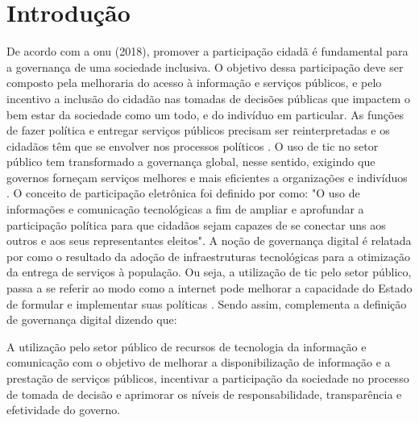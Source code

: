 \chapter[Introdução]{Introdução}
\label{cap:cap1}
\par
De acordo com a \acrfull{onu} (2018), promover a participação cidadã é fundamental para a governança de uma sociedade inclusiva.
O objetivo dessa participação deve ser composto pela melhoraria do acesso à informação e serviços públicos,
e pelo incentivo a inclusão do cidadão nas tomadas de decisões públicas que impactem o bem estar da sociedade como um todo, e do indivíduo em particular. 
As funções de fazer política e entregar serviços públicos precisam ser reinterpretadas e os cidadãos têm que se envolver nos processos políticos \cite{bovaird2007beyond}. 
O uso de \acrfull{tic} no setor público tem transformado a governança global, nesse sentido, exigindo que governos forneçam
serviços melhores e mais eficientes a organizações e indivíduos \cite{afdb2014uneca}. O conceito de participação eletrônica foi definido por \cite{macintosh2008democracy} como:
"O uso de informações e comunicação tecnológicas a fim de ampliar e aprofundar a participação política para que cidadãos sejam capazes de se conectar 
uns aos outros e aos seus representantes eleitos".
A noção de governança digital é relatada por \cite{reddick2012public} como o resultado da adoção de infraestruturas tecnológicas para a otimização da entrega de serviços à população.
Ou seja, a utilização de \acrshort{tic} pelo setor público, passa a se referir ao modo como a internet pode melhorar a capacidade do Estado de formular
e implementar suas políticas \cite{parra2017governancca}. Sendo assim, \cite{germani2016desafios} complementa a definição de governança digital dizendo que:

\hspace{4cm}
\begin{minipage}{.66\textwidth}		
    \begin{singlespace}
        \fontsize{10}{12}\selectfont A utilização pelo setor público de recursos de tecnologia da informação e comunicação com o objetivo de melhorar a disponibilização
        de informação e a prestação de serviços públicos,
        incentivar a participação da sociedade no processo de tomada de decisão e aprimorar os níveis de responsabilidade, transparência e efetividade do governo.    
        \end{singlespace}
\end{minipage}

